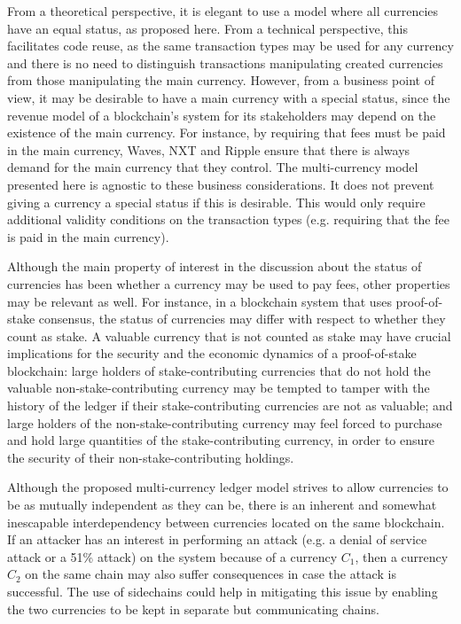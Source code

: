 \documentclass{llncs}
\begin{document}
From a theoretical perspective, it is elegant to use a model where all currencies have an equal status, as proposed here. From a technical perspective, this facilitates code reuse, as the same transaction types may be used for any currency and there is no need to distinguish transactions manipulating created currencies from those manipulating the main currency. However, from a business point of view, it may be desirable to have a main currency with a special status, since the revenue model of a blockchain's system for its stakeholders may depend on the existence of the main currency. For instance, by requiring that fees must be paid in the main currency, Waves, NXT and Ripple ensure that there is always demand for the main currency that they control. The multi-currency model presented here is agnostic to these business considerations. It does not prevent giving a currency a special status if this is desirable. This would only require additional validity conditions on the transaction types (e.g. requiring that the fee is paid in the main currency).

Although the main property of interest in the discussion about the status of currencies has been whether a currency may be used to pay fees, other properties may be relevant as well. For instance, in a blockchain system that uses proof-of-stake consensus, the status of currencies may differ with respect to whether they count as stake. A valuable currency that is not counted as stake may have crucial implications for the security and the economic dynamics of a proof-of-stake blockchain: large holders of stake-contributing currencies that do not hold the valuable non-stake-contributing currency may be tempted to tamper with the history of the ledger if their stake-contributing currencies are not as valuable; and large holders of the non-stake-contributing currency may feel forced to purchase and hold large quantities of the stake-contributing currency, in order to ensure the security of their non-stake-contributing holdings.

Although the proposed multi-currency ledger model strives to allow currencies to be as mutually independent as they can be, there is an inherent and somewhat inescapable interdependency between currencies located on the same blockchain. If an attacker has an interest in performing an attack (e.g. a denial of service attack or a 51\% attack) on the system because of a currency $C_1$, then a currency $C_2$ on the same chain may also suffer consequences in case the attack is successful. The use of sidechains \cite{Sidechains,SidechainsShardagnostic} could help in mitigating this issue by enabling the two currencies to be kept in separate but communicating chains.
\end{document}
